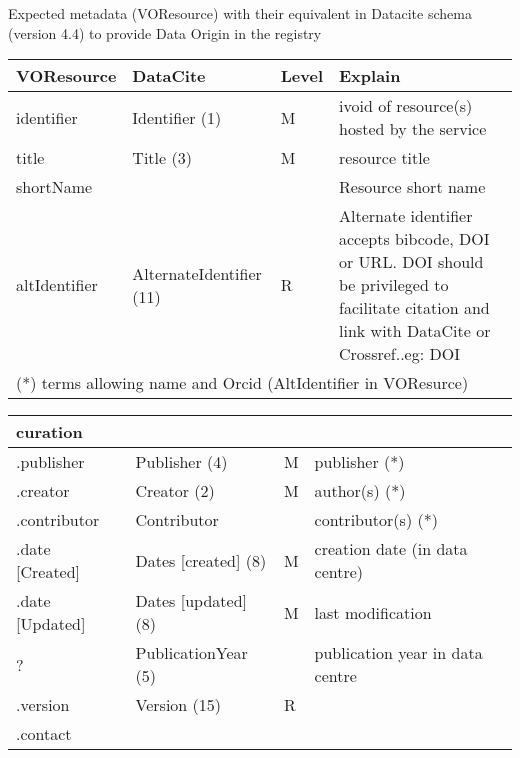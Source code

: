 \documentclass[11pt,a4paper]{ivoa}
\begin{document}
Expected metadata (VOResource) with their equivalent in Datacite schema (version 4.4) to provide Data Origin in the registry\\

\begin{tabular}{|p{3cm}|p{4cm}|p{1cm}|p{5cm}|} \hline
\textbf{VOResource} & \textbf{DataCite} & \textbf{Level} & \textbf{Explain} \\ \hline
identifier    &Identifier (1) &M & ivoid of resource(s) hosted by the service\\ \hline
title         &Title (3) &M  & resource title\\ \hline
shortName     &&& Resource short name\\ \hline
altIdentifier & AlternateIdentifier (11)& R &
              Alternate identifier accepts bibcode, DOI or URL. DOI should be privileged to facilitate citation and link with DataCite or Crossref..eg: DOI \\ \hline
\multicolumn{4}{l}{(*) terms allowing name and Orcid (AltIdentifier in VOResurce)} \\
\end{tabular}

\begin{tabular}{|p{3cm}|p{4cm}|p{1cm}|p{5cm}|} \hline
\multicolumn{4}{|l|}{\textbf{curation}} \\ \hline
.publisher     & Publisher (4) & M &publisher (*)\\ \hline
.creator       & Creator (2) & M & author(s) (*)\\ \hline
.contributor   & Contributor & & contributor(s) (*)\\ \hline
.date [Created]& Dates [created] (8)& M & creation date (in data centre)\\ \hline
.date [Updated]& Dates [updated] (8)& M & last modification\\ \hline
  ?            & PublicationYear (5) & & publication year in data centre\\ \hline
.version       & Version (15) & R &\\ \hline
.contact       & &&\\ \hline
\end{tabular}
\end{document}
